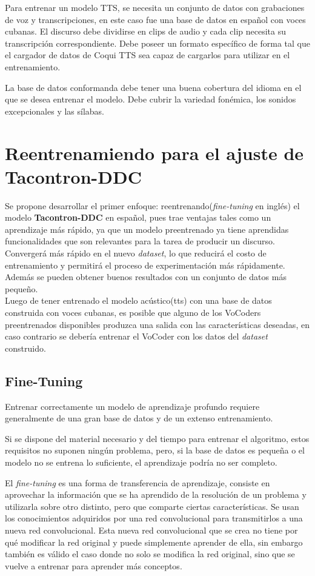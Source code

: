 Para entrenar un modelo TTS, se necesita un conjunto de datos con grabaciones de voz y transcripciones, en este caso fue una base de datos en español con voces cubanas. El discurso debe dividirse en clips de audio y cada clip necesita su transcripción correspondiente. Debe poseer un formato específico de forma tal que el cargador de datos de Coqui TTS sea capaz de cargarlos para utilizar en el entrenamiento.    

La base de datos conformanda debe tener una buena cobertura del idioma en el que se desea entrenar el modelo. Debe cubrir la variedad fonémica, los sonidos excepcionales y las sílabas. 


\section{Reentrenamiendo para el ajuste de Tacontron-DDC}

Se propone desarrollar el primer enfoque: reentrenando(\textit{fine-tuning} en inglés) el modelo \textbf{Tacontron-DDC} en español, pues trae ventajas tales como un aprendizaje más rápido, ya que un modelo preentrenado ya tiene aprendidas funcionalidades que son relevantes para la tarea de producir un discurso. Convergerá más rápido en el nuevo \textit{dataset}, lo que reducirá el costo de entrenamiento y permitirá el proceso de experimentación más rápidamente. Además se pueden obtener buenos resultados con un conjunto de datos más pequeño.\\

Luego de tener entrenado el modelo acústico(tts) con una base de datos construida con voces cubanas, es posible que alguno de los VoCoders preentrenados disponibles produzca una salida con las características deseadas, en caso contrario se debería entrenar el VoCoder con los datos del \textit{dataset} construido.

\subsection{Fine-Tuning}
Entrenar correctamente un modelo de aprendizaje profundo requiere generalmente de una gran base de datos y de un extenso entrenamiento.

Si se dispone del material necesario y del tiempo para entrenar el algoritmo, estos requisitos no suponen ningún problema, pero, si la base de datos es pequeña o el modelo no se entrena lo suficiente, el aprendizaje podría no ser completo.

El \textit{fine-tuning} es una forma de transferencia de aprendizaje, consiste en aprovechar la información que se ha aprendido de
la resolución de un problema y utilizarla sobre otro distinto, pero que comparte ciertas características. Se usan los conocimientos adquiridos por una red convolucional para transmitirlos a una nueva red convolucional. Esta nueva red convolucional que se crea no tiene por qué modificar la red original y puede simplemente aprender de ella, sin embargo también es válido el caso donde no solo se modifica la red original, sino que se vuelve a entrenar para aprender más conceptos.
  
